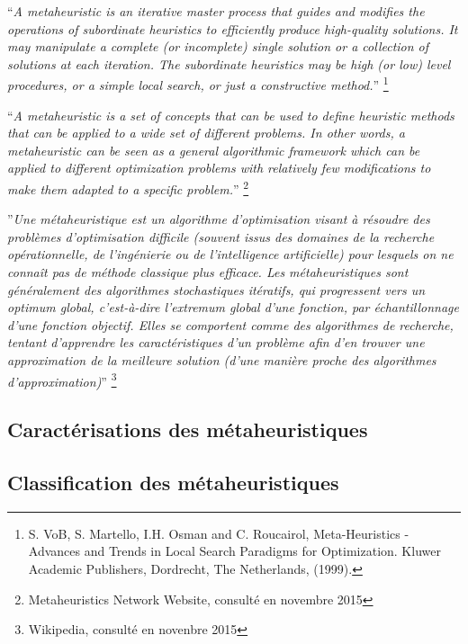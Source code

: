 \documentclass[a4paper,11pt,oneside]{report}
\theoremstyle{plain}
\newcommand{\0}{/ \! \! \! 0}
\theoremstyle{plain}
\begin{document}
 
  ``{\it A metaheuristic is an iterative master process that guides and modifies the operations of subordinate heuristics to efficiently produce
  high-quality solutions. It may manipulate a complete (or incomplete) single solution or a collection of solutions at each iteration. The
  subordinate heuristics may be high (or low) level procedures, or a simple local search, or just a constructive method.}'' \footnote{S. VoB, S. Martello, 
  I.H. Osman and C. Roucairol, Meta-Heuristics - Advances and Trends in Local Search Paradigms for Optimization. Kluwer Academic Publishers, 
  Dordrecht, The Netherlands, (1999).}\vspace{0.5cm}
  
  
  ``{\it A metaheuristic is a set of concepts that can be used to define heuristic methods that can be applied to a wide set of different problems.
  In other words, a metaheuristic can be seen as a general algorithmic framework which can be applied to different optimization problems with
  relatively few modifications to make them adapted to a specific problem.}'' \footnote{Metaheuristics Network Website, consult\'e en novembre 2015}
  \vspace{0.5cm}
  
  ''{\it Une m\'etaheuristique est un algorithme d'optimisation visant \`a r\'esoudre des probl\`emes d'optimisation difficile (souvent issus des domaines
  de la recherche op\'erationnelle, de l'ing\'enierie ou de l'intelligence artificielle) pour lesquels on ne conna\^it pas de m\'ethode classique plus
  efficace. Les m\'etaheuristiques sont g\'en\'eralement des algorithmes stochastiques it\'eratifs, qui progressent vers un optimum global,
  c'est-\`a-dire l'extremum global d'une fonction, par \'echantillonnage d'une fonction objectif. Elles se comportent comme des algorithmes de recherche,
  tentant d'apprendre les caract\'eristiques d'un probl\`eme afin d'en trouver une approximation de la meilleure solution (d'une mani\`ere proche
  des algorithmes d'approximation)}''  \footnote{Wikipedia, consult\'e en novenbre 2015}
\subsection{Caract\'erisations des m\'etaheuristiques}

\subsection{Classification des m\'etaheuristiques}
\end{document}

